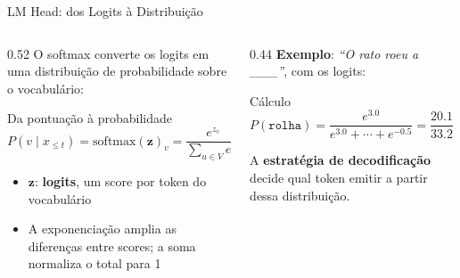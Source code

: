 \documentclass[aspectratio=169, xcolor=dvipsnames]{beamer}
\begin{document}
  \begin{frame}{LM Head: dos Logits à Distribuição}
    \begin{columns}[T]
      \begin{column}{0.52\textwidth}
        O softmax converte os logits em uma distribuição de probabilidade sobre o vocabulário:
        \begin{block}{Da pontuação à probabilidade}
          $P(v \mid x_{\le t}) = \text{softmax}(\mathbf{z})_v = \dfrac{e^{z_v}}{\sum_{u \in V} e^{z_u}}$
        \end{block}
        \vspace{0.3em}
        \begin{itemize}
          \item $\mathbf{z}$: \textbf{logits}, um score por token do vocabulário
          \item A exponenciação amplia as diferenças entre scores; a soma normaliza o total para 1
        \end{itemize}
      \end{column}
      \begin{column}{0.44\textwidth}
        \footnotesize\textbf{Exemplo}: \textit{``O rato roeu a \_\_\_''}, com os logits:\\[0.4em]
        \vspace{0.4em}
        \begin{exampleblock}{\footnotesize Cálculo}
          \scriptsize $P(\texttt{rolha}) = \dfrac{e^{3.0}}{e^{3.0}+\cdots+e^{-0.5}} = \dfrac{20.1}{33.2} \approx 0.60$
        \end{exampleblock}
        \vspace{0.2em}
        {\scriptsize A \textbf{estratégia de decodificação} decide qual token emitir a partir dessa distribuição.}
      \end{column}
    \end{columns}
  \end{frame}
\end{document}
